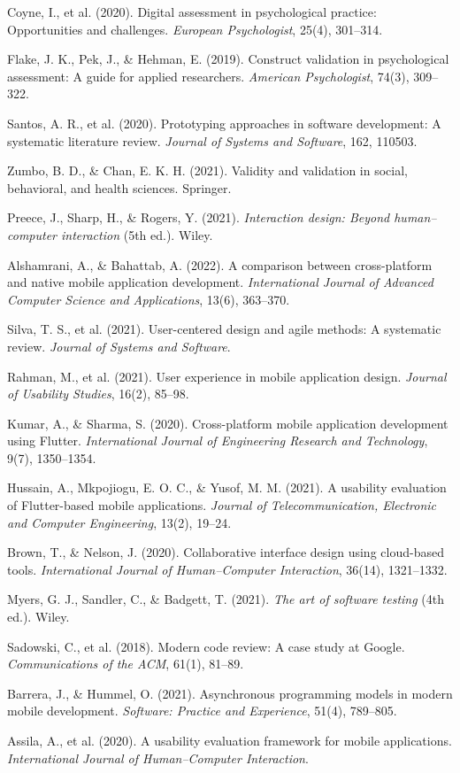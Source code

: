 Coyne, I., et al. (2020). Digital assessment in psychological practice: Opportunities and challenges. \textit{European Psychologist}, 25(4), 301--314.

Flake, J. K., Pek, J., \& Hehman, E. (2019). Construct validation in psychological assessment: A guide for applied researchers. \textit{American Psychologist}, 74(3), 309--322.

Santos, A. R., et al. (2020). Prototyping approaches in software development: A systematic literature review. \textit{Journal of Systems and Software}, 162, 110503.

Zumbo, B. D., \& Chan, E. K. H. (2021). Validity and validation in social, behavioral, and health sciences. Springer.

Preece, J., Sharp, H., \& Rogers, Y. (2021). \textit{Interaction design: Beyond human--computer interaction} (5th ed.). Wiley.

Alshamrani, A., \& Bahattab, A. (2022). A comparison between cross-platform and native mobile application development. \textit{International Journal of Advanced Computer Science and Applications}, 13(6), 363--370.

Silva, T. S., et al. (2021). User-centered design and agile methods: A systematic review. \textit{Journal of Systems and Software}.

Rahman, M., et al. (2021). User experience in mobile application design. \textit{Journal of Usability Studies}, 16(2), 85--98.

Kumar, A., \& Sharma, S. (2020). Cross-platform mobile application development using Flutter. \textit{International Journal of Engineering Research and Technology}, 9(7), 1350--1354.

Hussain, A., Mkpojiogu, E. O. C., \& Yusof, M. M. (2021). A usability evaluation of Flutter-based mobile applications. \textit{Journal of Telecommunication, Electronic and Computer Engineering}, 13(2), 19--24.

Brown, T., \& Nelson, J. (2020). Collaborative interface design using cloud-based tools. \textit{International Journal of Human--Computer Interaction}, 36(14), 1321--1332.

Myers, G. J., Sandler, C., \& Badgett, T. (2021). \textit{The art of software testing} (4th ed.). Wiley.

Sadowski, C., et al. (2018). Modern code review: A case study at Google. \textit{Communications of the ACM}, 61(1), 81--89.

Barrera, J., \& Hummel, O. (2021). Asynchronous programming models in modern mobile development. \textit{Software: Practice and Experience}, 51(4), 789--805.

Assila, A., et al. (2020). A usability evaluation framework for mobile applications. \textit{International Journal of Human--Computer Interaction}.
